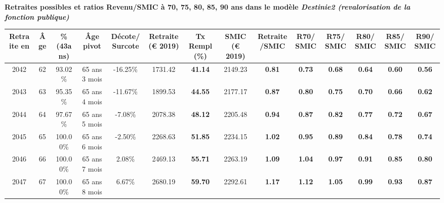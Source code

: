  \vspace{0.1cm} 
{\bf \noindent Retraites possibles et ratios Revenu/SMIC à 70, 75, 80, 85, 90 ans dans le modèle \emph{Destinie2 (revalorisation de la fonction publique)}}  
 
\begin{adjustbox}{max width=\textwidth} 
\begin{tabular}[htb]{|c|c||c|c|c||c|c||c|c||c|c|c|c|c|} 
\hline 
 Retraite en &  Âge &  \%(43ans) &  Âge pivot &  Décote/Surcote &  Retraite (\euro{} 2019) &  Tx Rempl(\%) &  SMIC (\euro{} 2019) &  Retraite/SMIC &  R70/SMIC &  R75/SMIC &  R80/SMIC &  R85/SMIC &  R90/SMIC \\ 
\hline \hline 
 2042 &  62 &  93.02\% &  65 ans 3 mois &  -16.25\% &  1731.42 &  {\bf 41.14} &  2149.23 &  {\bf {\color{red} 0.81}} &  {\bf {\color{red} 0.73}} &  {\bf {\color{red} 0.68}} &  {\bf {\color{red} 0.64}} &  {\bf {\color{red} 0.60}} &  {\bf {\color{red} 0.56}} \\ 
\hline 
 2043 &  63 &  95.35\% &  65 ans 4 mois &  -11.67\% &  1899.53 &  {\bf 44.55} &  2177.17 &  {\bf {\color{red} 0.87}} &  {\bf {\color{red} 0.80}} &  {\bf {\color{red} 0.75}} &  {\bf {\color{red} 0.70}} &  {\bf {\color{red} 0.66}} &  {\bf {\color{red} 0.62}} \\ 
\hline 
 2044 &  64 &  97.67\% &  65 ans 5 mois &  -7.08\% &  2078.38 &  {\bf 48.12} &  2205.48 &  {\bf {\color{red} 0.94}} &  {\bf {\color{red} 0.87}} &  {\bf {\color{red} 0.82}} &  {\bf {\color{red} 0.77}} &  {\bf {\color{red} 0.72}} &  {\bf {\color{red} 0.67}} \\ 
\hline 
 2045 &  65 &  100.00\% &  65 ans 6 mois &  -2.50\% &  2268.63 &  {\bf 51.85} &  2234.15 &  {\bf 1.02} &  {\bf {\color{red} 0.95}} &  {\bf {\color{red} 0.89}} &  {\bf {\color{red} 0.84}} &  {\bf {\color{red} 0.78}} &  {\bf {\color{red} 0.74}} \\ 
\hline 
 2046 &  66 &  100.00\% &  65 ans 7 mois &  2.08\% &  2469.13 &  {\bf 55.71} &  2263.19 &  {\bf 1.09} &  {\bf 1.04} &  {\bf {\color{red} 0.97}} &  {\bf {\color{red} 0.91}} &  {\bf {\color{red} 0.85}} &  {\bf {\color{red} 0.80}} \\ 
\hline 
 2047 &  67 &  100.00\% &  65 ans 8 mois &  6.67\% &  2680.19 &  {\bf 59.70} &  2292.61 &  {\bf 1.17} &  {\bf 1.12} &  {\bf 1.05} &  {\bf {\color{red} 0.99}} &  {\bf {\color{red} 0.93}} &  {\bf {\color{red} 0.87}} \\ 
\hline 
\hline 
\end{tabular} 
\end{adjustbox} 
 
